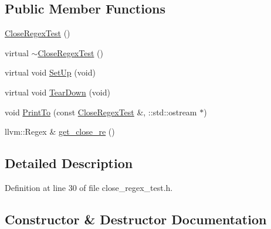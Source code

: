 \subsection*{Public Member Functions}
\begin{DoxyCompactItemize}
\item 
\hyperlink{classclang_1_1tidy_1_1pagesjaunes_1_1test_1_1_close_regex_test_a7e2b60e6c461f44f3c2162acd435b897}{Close\+Regex\+Test} ()
\item 
virtual \hyperlink{classclang_1_1tidy_1_1pagesjaunes_1_1test_1_1_close_regex_test_a6bc81fa6612bebdb3a170b03a6eac6fd}{$\sim$\+Close\+Regex\+Test} ()
\item 
virtual void \hyperlink{classclang_1_1tidy_1_1pagesjaunes_1_1test_1_1_close_regex_test_ae8c7f5fef7ce41611e43fab8e337f119}{Set\+Up} (void)
\item 
virtual void \hyperlink{classclang_1_1tidy_1_1pagesjaunes_1_1test_1_1_close_regex_test_a9544a575d6ad828b445aea37abefcbbd}{Tear\+Down} (void)
\item 
void \hyperlink{classclang_1_1tidy_1_1pagesjaunes_1_1test_1_1_close_regex_test_a6c2e158e217ef8d330ef4a5799bbce6d}{Print\+To} (const \hyperlink{classclang_1_1tidy_1_1pagesjaunes_1_1test_1_1_close_regex_test}{Close\+Regex\+Test} \&, \+::std\+::ostream $\ast$)
\item 
llvm\+::\+Regex \& \hyperlink{classclang_1_1tidy_1_1pagesjaunes_1_1test_1_1_close_regex_test_a7e45686a81da60c71888f5021a679ff9}{get\+\_\+close\+\_\+re} ()
\end{DoxyCompactItemize}


\subsection{Detailed Description}


Definition at line 30 of file close\+\_\+regex\+\_\+test.\+h.



\subsection{Constructor \& Destructor Documentation}
\mbox{\label{classclang_1_1tidy_1_1pagesjaunes_1_1test_1_1_close_regex_test_a7e2b60e6c461f44f3c2162acd435b897}} 

